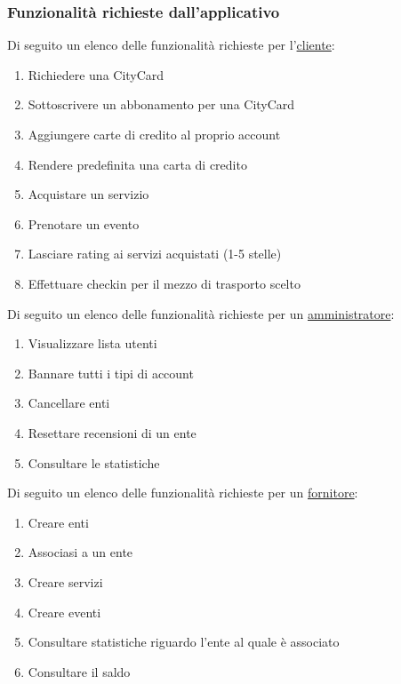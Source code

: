 

\vspace{0.5cm}
\subsubsection{Funzionalità richieste dall'applicativo}
Di seguito un elenco delle funzionalità richieste per l'\ul{cliente}:
\begin{enumerate}[label=c\arabic*)]
    \item Richiedere una CityCard
    \item Sottoscrivere un abbonamento per una CityCard
    \item Aggiungere carte di credito al proprio account
    \item Rendere predefinita una carta di credito
    \item Acquistare un servizio
    \item Prenotare un evento
    \item Lasciare rating ai servizi acquistati (1-5 stelle)
    \item Effettuare checkin per il mezzo di trasporto scelto
\end{enumerate}

Di seguito un elenco delle funzionalità richieste per un \ul{amministratore}:
\begin{enumerate}[label=a\arabic*)]
    \item Visualizzare lista utenti
    \item Bannare tutti i tipi di account
    \item Cancellare enti
    \item Resettare recensioni di un ente
    \item Consultare le statistiche
\end{enumerate}

\vspace{0.5cm}

Di seguito un elenco delle funzionalità richieste per un \ul{fornitore}: 
\begin{enumerate}[label=b\arabic*)]
    \item Creare enti
    \item Associasi a un ente
    \item Creare servizi
    \item Creare eventi
    \item Consultare statistiche riguardo l'ente al quale è associato 
    \item Consultare il saldo
    
\end{enumerate}


